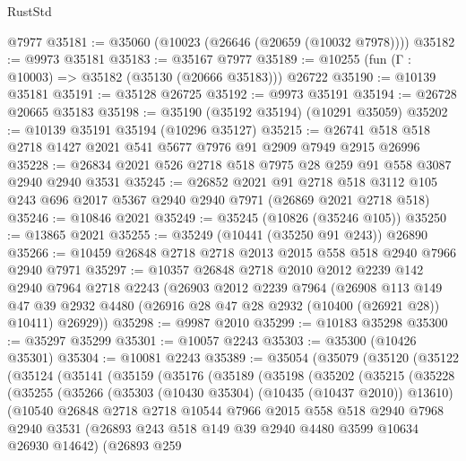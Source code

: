 \begin{lexlean}{RustStd}
\begin{coremodule}
    @7977
@35181 := @35060 (@10023 (@26646 (@20659 (@10032 @7978))))
@35182 := @9973 @35181
@35183 := @35167 @7977
@35189 := @10255 (fun (Γ : @10003) => @35182 (@35130 (@20666 @35183))) @26722
@35190 := @10139 @35181
@35191 := @35128 @26725
@35192 := @9973 @35191
@35194 := @26728 @20665 @35183
@35198 := @35190 (@35192 @35194) (@10291 @35059)
@35202 := @10139 @35191 @35194 (@10296 @35127)
@35215 := @26741 @518 @518 @2718 @1427 @2021 @541 @5677 @7976 @91 @2909 @7949 @2915 @26996
@35228 := @26834 @2021 @526 @2718 @518 @7975 @28 @259 @91 @558 @3087 @2940 @2940 @3531
@35245 := @26852
    @2021
    @91
    @2718
    @518
    @3112
    @105
    @243
    @696
    @2017
    @5367
    @2940
    @2940
    @7971
    (@26869 @2021 @2718 @518)
@35246 := @10846 @2021
@35249 := @35245 (@10826 (@35246 @105))
@35250 := @13865 @2021
@35255 := @35249 (@10441 (@35250 @91 @243)) @26890
@35266 := @10459 @26848 @2718 @2718 @2013 @2015 @558 @518 @2940 @7966 @2940 @7971
@35297 := @10357
    @26848
    @2718
    @2010
    @2012
    @2239
    @142
    @2940
    @7964
    @2718
    @2243
    (@26903
      @2012
      @2239
      @7964
      (@26908
        @113
        @149
        @47
        @39
        @2932
        @4480
        (@26916 @28 @47 @28 @2932 (@10400 (@26921 @28)) @10411)
        @26929))
@35298 := @9987 @2010
@35299 := @10183 @35298
@35300 := @35297 @35299
@35301 := @10057 @2243
@35303 := @35300 (@10426 @35301)
@35304 := @10081 @2243
@35389 := @35054
    (@35079
      (@35120
        (@35122
          (@35124
            (@35141
              (@35159
                (@35176
                  (@35189
                    (@35198
                      (@35202
                        (@35215
                          (@35228
                            (@35255
                              (@35266
                                (@35303 (@10430 @35304) (@10435 (@10437 @2010)) @13610)
                                (@10540
                                  @26848
                                  @2718
                                  @2718
                                  @10544
                                  @7966
                                  @2015
                                  @558
                                  @518
                                  @2940
                                  @7968
                                  @2940
                                  @3531
                                  (@26893 @243 @518 @149 @39 @2940 @4480 @3599 @10634 @26930 @14642)
                                  (@26893
                                    @259

\end{coremodule}
\end{lexlean}
